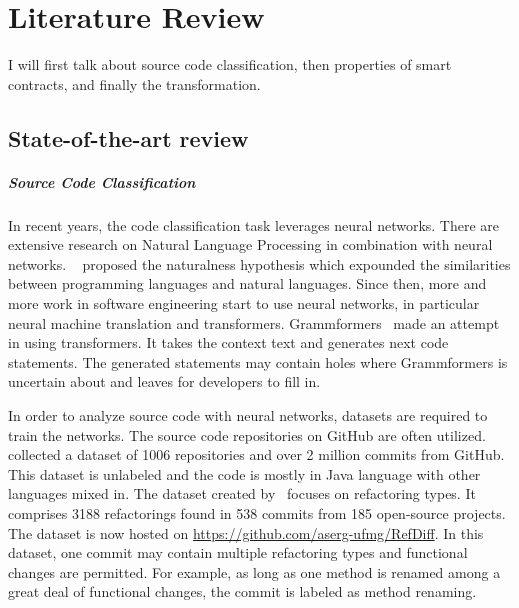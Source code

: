 \chapter{Literature Review}


I will first talk about source code classification, then properties of smart contracts, and finally the transformation.

\section{State-of-the-art review}

\paragraph*{Source Code Classification}
In recent years, the code classification task leverages neural networks.
There are extensive research on Natural Language Processing in combination with neural networks. ~\cite{allamanis2018survey} proposed the naturalness hypothesis which expounded the similarities between programming languages and natural languages. Since then, more and more work in software engineering start to use neural networks, in particular neural machine translation and transformers.
Grammformers~\cite{guo2021learning} made an attempt in using transformers. It takes the context text and generates next code statements. The generated statements may contain holes where Grammformers is uncertain about and leaves for developers to fill in.

In order to analyze source code with neural networks, datasets are required to train the networks. The source code repositories on GitHub are often utilized.
~\cite{jiang2017} collected a dataset of \num{1006} repositories and over 2 million commits from GitHub. This dataset is unlabeled and the code is mostly in Java language with other languages mixed in.
The dataset created by~\cite{tsantalis2018accurate} focuses on refactoring types. It comprises \num{3188} refactorings found in 538 commits from 185 open-source projects. The dataset is now hosted on \url{https://github.com/aserg-ufmg/RefDiff}. In this dataset, one commit may contain multiple refactoring types and functional changes are permitted. For example, as long as one method is renamed among a great deal of functional changes, the commit is labeled as method renaming.

